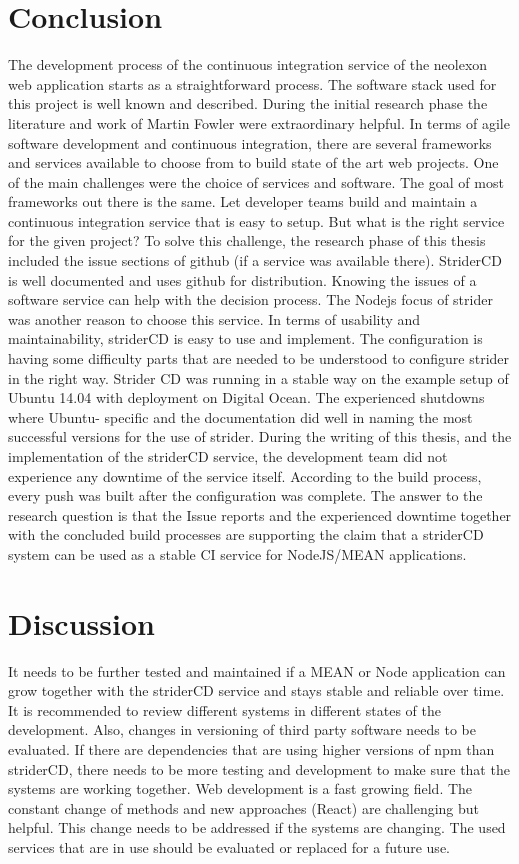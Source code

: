 \section{Conclusion}
\label{section:Conclusion}
The development process of the continuous integration service of the neolexon web application starts as a straightforward process. The software stack
used for this project is well known and described. During the initial research phase the literature and work of Martin Fowler were extraordinary
helpful. In terms of agile software development and continuous integration, there are several frameworks and services available to choose from to build
state of the art web projects. One of the main challenges were the choice of services and software. The goal of most frameworks out there is
the same. Let developer teams build and maintain a continuous integration service that is easy to setup. But what is the right service for the given project?
To solve this challenge, the research phase of this thesis included the issue sections of github (if a service was available there). StriderCD is well
documented and uses github for distribution. Knowing the issues of a software service can help with the decision process. The Nodejs focus of strider
was another reason to choose this service. In terms of usability and maintainability, striderCD is easy to use and implement. The configuration is having
some difficulty parts that are needed to be understood to configure strider in the right way. Strider CD was running in a stable way on the example setup
of Ubuntu 14.04 with deployment on Digital Ocean. The experienced shutdowns where Ubuntu- specific and the documentation did well in naming the most
successful versions for the use of strider. During the writing of this thesis, and the implementation of the striderCD service, the development team did
not experience any downtime of the service itself. According to the build process, every push was built after the configuration was complete. The answer
to the research question is that the Issue reports and the experienced downtime together with the concluded build processes are supporting the claim that
a striderCD system can be used as a stable CI service for NodeJS/MEAN applications.

\section{Discussion}
\label{section:Discussion}
It needs to be further tested and maintained if a MEAN or Node application can grow together with the striderCD service and stays stable and reliable
over time. It is recommended to review different systems in different states of the development. Also, changes in versioning of third party software
needs to be evaluated. If there are dependencies that are using higher versions of npm than striderCD, there needs to be more testing and development
to make sure that the systems are working together. Web development is a fast growing field. The constant change of methods and new approaches (React)
are challenging but helpful. This change needs to be addressed if the systems are changing. The used services that are in use should be evaluated or replaced
for a future use. 

